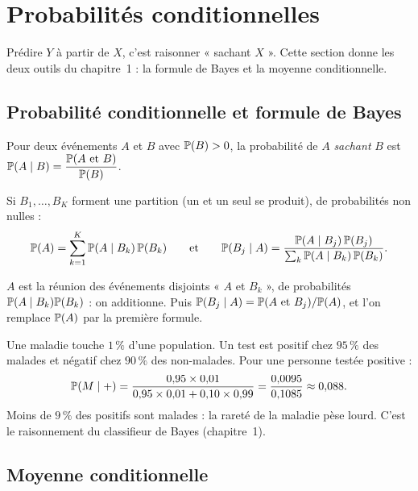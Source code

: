 \section{Probabilités conditionnelles}
\label{sec:conditionnement}

Prédire $Y$ à partir de $X$, c'est raisonner « sachant $X$ ». Cette section donne les deux outils du chapitre~1 : la formule de Bayes et la moyenne conditionnelle.

\subsection{Probabilité conditionnelle et formule de Bayes}

\begin{definition}
Pour deux événements $A$ et $B$ avec $\P(B)>0$, la probabilité de $A$ \emph{sachant} $B$ est $\P(A\mid B)=\dfrac{\P(A\text{ et }B)}{\P(B)}$.
\end{definition}

\begin{proposition}
\label{prop:bayes}
Si $B_1,\dots,B_K$ forment une partition (un et un seul se produit), de probabilités non nulles :
\[
  \P(A)=\sum_{k=1}^K\P(A\mid B_k)\,\P(B_k)
  \qquad\text{et}\qquad
  \P(B_j\mid A)=\frac{\P(A\mid B_j)\,\P(B_j)}{\sum_k\P(A\mid B_k)\,\P(B_k)} .
\]
\end{proposition}
\begin{preuve}
$A$ est la réunion des événements disjoints « $A$ et $B_k$ », de probabilités $\P(A\mid B_k)\P(B_k)$ : on additionne.
Puis $\P(B_j\mid A)=\P(A\text{ et }B_j)/\P(A)$, et l'on remplace $\P(A)$ par la première formule.
\end{preuve}

\begin{exemple}
Une maladie touche $1\,\%$ d'une population. Un test est positif chez $95\,\%$ des malades et négatif chez $90\,\%$ des non-malades. Pour une personne testée positive :
\[
  \P(M\mid+)=\frac{0{,}95\times0{,}01}{0{,}95\times0{,}01+0{,}10\times0{,}99}=\frac{0{,}0095}{0{,}1085}\approx0{,}088 .
\]
Moins de $9\,\%$ des positifs sont malades : la rareté de la maladie pèse lourd. C'est le raisonnement du classifieur de Bayes (chapitre~1).
\end{exemple}

\subsection{Moyenne conditionnelle}

